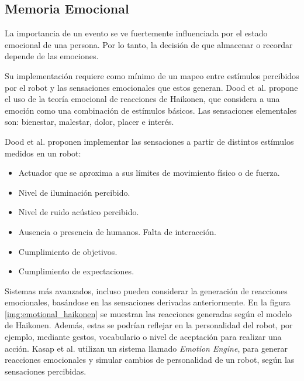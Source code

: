 %
\cite{Winkler2014}



\subsection{Memoria Emocional}

La importancia de un evento se ve fuertemente influenciada por el estado emocional de una persona. Por lo tanto, la decisión de que almacenar o recordar depende de las emociones\cite{Deutsch2008}.

Su implementación requiere como mínimo de un mapeo entre estímulos percibidos por el robot y las sensaciones emocionales que estos generan. Dood et al. \cite{Dodd2005} propone el uso de la teoría emocional de reacciones de Haikonen, que considera a una emoción como una combinación de estímulos básicos. Las sensaciones elementales son: bienestar, malestar, dolor, placer e interés.

Dood et al. proponen implementar las sensaciones a partir de distintos estímulos medidos en un robot:

\begin{itemize}[topsep=0pt]
\setlength\itemsep{0.2em}
\item Actuador que se aproxima a sus límites de movimiento físico o de fuerza. 
\item Nivel de iluminación percibido.
\item Nivel de ruido acústico percibido.
\item Ausencia o presencia de humanos. Falta de interacción.
\item Cumplimiento de objetivos.
\item Cumplimiento de expectaciones.
\end{itemize}


Sistemas más avanzados, incluso pueden considerar la generación de reacciones emocionales, basándose en las sensaciones derivadas anteriormente. En la figura \ref{img:emotional_haikonen} se muestran las reacciones generadas según el modelo de Haikonen. Además, estas se podrían reflejar en la personalidad del robot, por ejemplo, mediante gestos, vocabulario o nivel de aceptación para realizar una acción. Kasap et al. \cite{Kasap2010} utilizan un sistema llamado \textit{Emotion Engine}, para generar reacciones emocionales y simular cambios de personalidad de un robot, según las sensaciones percibidas.

